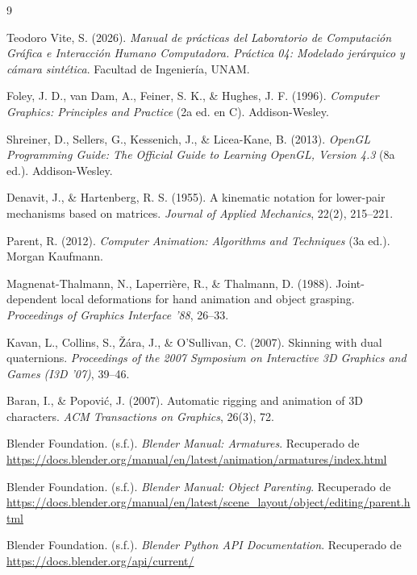 \begin{thebibliography}{9}

Teodoro Vite, S. (2026). \textit{Manual de prácticas del Laboratorio de Computación Gráfica e Interacción Humano Computadora. Práctica 04: Modelado jerárquico y cámara sintética}. Facultad de Ingeniería, UNAM.

Foley, J. D., van Dam, A., Feiner, S. K., \& Hughes, J. F. (1996). \textit{Computer Graphics: Principles and Practice} (2a ed. en C). Addison-Wesley.

Shreiner, D., Sellers, G., Kessenich, J., \& Licea-Kane, B. (2013). \textit{OpenGL Programming Guide: The Official Guide to Learning OpenGL, Version 4.3} (8a ed.). Addison-Wesley.

Denavit, J., \& Hartenberg, R. S. (1955). A kinematic notation for lower-pair mechanisms based on matrices. \textit{Journal of Applied Mechanics}, 22(2), 215--221.

Parent, R. (2012). \textit{Computer Animation: Algorithms and Techniques} (3a ed.). Morgan Kaufmann.

Magnenat-Thalmann, N., Laperri\`ere, R., \& Thalmann, D. (1988). Joint-dependent local deformations for hand animation and object grasping. \textit{Proceedings of Graphics Interface '88}, 26--33.

Kavan, L., Collins, S., \v{Z}\'ara, J., \& O'Sullivan, C. (2007). Skinning with dual quaternions. \textit{Proceedings of the 2007 Symposium on Interactive 3D Graphics and Games (I3D '07)}, 39--46.

Baran, I., \& Popovi\'c, J. (2007). Automatic rigging and animation of 3D characters. \textit{ACM Transactions on Graphics}, 26(3), 72.

Blender Foundation. (s.f.). \textit{Blender Manual: Armatures}. Recuperado de \url{https://docs.blender.org/manual/en/latest/animation/armatures/index.html}

Blender Foundation. (s.f.). \textit{Blender Manual: Object Parenting}. Recuperado de \url{https://docs.blender.org/manual/en/latest/scene_layout/object/editing/parent.html}

Blender Foundation. (s.f.). \textit{Blender Python API Documentation}. Recuperado de \url{https://docs.blender.org/api/current/}


\end{thebibliography}
